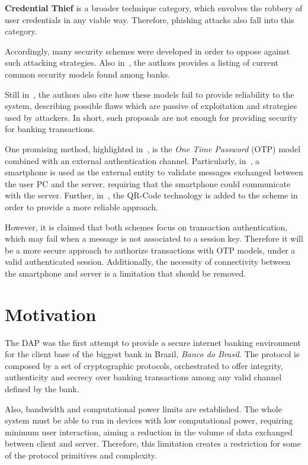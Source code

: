\textbf{Credential Thief} is a broader technique category, which envolves the robbery of user credentials in any viable way. Therefore, phishing attacks also fall into this category.

Accordingly, many security schemes were developed in order to oppose against such attacking strategies. Also in~\cite{Peotta2011, Adham2013}, the authors provides a listing of current common security models found among banks.

Still in~\cite{Peotta2011, Adham2013}, the authors also cite how these models fail to provide reliability to the system, describing possible flaws which are passive of exploitation and strategies used by attackers. In short, such proposals are not enough for providing security for banking transactions.

One promising method, highlighted in~\cite[p.61]{Peotta2012}, is the \textit{One Time Password} (OTP) model combined with an external authentication channel. Particularly, in~\cite{Starnberger2009}, a smartphone is used as the external entity to validate messages exchanged between the user PC and the server, requiring that the smartphone could communicate with the server. Further, in~\cite{LeeHyunLim2010}, the QR-Code technology is added to the scheme in order to provide a more reliable approach.

However, it is claimed that both schemes focus on transaction authentication, which may fail when a message is not associated to a session key. Therefore it will be a more secure approach to authorize transactions with OTP models, under a valid authenticated session. Additionally, the necessity of connectivity between the smartphone and server is a limitation that should be removed.





\section{Motivation}
The DAP was the first attempt to provide a secure internet banking environment for the client base of the biggest bank in Brazil, \textit{Banco do Brasil}. The protocol is composed by a set of cryptographic protocols, orchestrated to offer integrity, authenticity and secrecy over banking transactions among any valid channel defined by the bank.

Also, bandwidth and computational power limits are established. The whole system must be able to run in devices with low computational power, requiring minimum user interaction, aiming a reduction in the volume of data exchanged between client and server. Therefore, this limitation creates a restriction for some of the protocol primitives and complexity.

